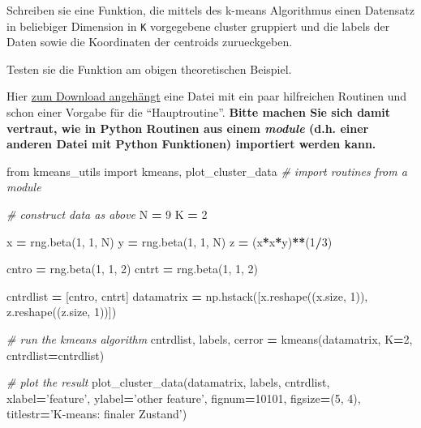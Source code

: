 \documentclass[]{book}
\newenvironment{Shaded}{\begin{snugshade}}{\end{snugshade}}
\newcommand{\CommentTok}[1]{\textcolor[rgb]{0.56,0.35,0.01}{\textit{#1}}}
\newcommand{\DecValTok}[1]{\textcolor[rgb]{0.00,0.00,0.81}{#1}}
\newcommand{\ImportTok}[1]{#1}
\newcommand{\NormalTok}[1]{#1}
\newcommand{\OperatorTok}[1]{\textcolor[rgb]{0.81,0.36,0.00}{\textbf{#1}}}
\newcommand{\StringTok}[1]{\textcolor[rgb]{0.31,0.60,0.02}{#1}}
\theoremstyle{definition}
\theoremstyle{definition}
\theoremstyle{definition}
\theoremstyle{definition}
\theoremstyle{remark}
\begin{document}
Schreiben sie eine Funktion, die mittels des k-means Algorithmus einen Datensatz in beliebiger Dimension in \texttt{K} vorgegebene cluster gruppiert und die labels der Daten sowie die Koordinaten der centroids zurueckgeben.

Testen sie die Funktion am obigen theoretischen Beispiel.

Hier \href{bilder/kmeans_utils.py}{zum Download angehängt} eine Datei mit ein paar hilfreichen Routinen und schon einer Vorgabe für die ``Hauptroutine''. \textbf{Bitte machen Sie sich damit vertraut, wie in Python Routinen aus einem \emph{module} (d.h. einer anderen Datei mit Python Funktionen) importiert werden kann.}

\begin{Shaded}
\begin{Highlighting}[]
\ImportTok{from}\NormalTok{ kmeans_utils }\ImportTok{import}\NormalTok{ kmeans, plot_cluster_data}
\CommentTok{# import routines from a module}

\CommentTok{# construct data as above}
\NormalTok{N }\OperatorTok{=} \DecValTok{9}
\NormalTok{K }\OperatorTok{=} \DecValTok{2}

\NormalTok{x }\OperatorTok{=}\NormalTok{ rng.beta(}\DecValTok{1}\NormalTok{, }\DecValTok{1}\NormalTok{, N)}
\NormalTok{y }\OperatorTok{=}\NormalTok{ rng.beta(}\DecValTok{1}\NormalTok{, }\DecValTok{1}\NormalTok{, N)}
\NormalTok{z }\OperatorTok{=}\NormalTok{ (x}\OperatorTok{*}\NormalTok{x}\OperatorTok{*}\NormalTok{y)}\OperatorTok{**}\NormalTok{(}\DecValTok{1}\OperatorTok{/}\DecValTok{3}\NormalTok{)}

\NormalTok{cntro }\OperatorTok{=}\NormalTok{ rng.beta(}\DecValTok{1}\NormalTok{, }\DecValTok{1}\NormalTok{, }\DecValTok{2}\NormalTok{)}
\NormalTok{cntrt }\OperatorTok{=}\NormalTok{ rng.beta(}\DecValTok{1}\NormalTok{, }\DecValTok{1}\NormalTok{, }\DecValTok{2}\NormalTok{)}

\NormalTok{cntrdlist }\OperatorTok{=}\NormalTok{ [cntro, cntrt]}
\NormalTok{datamatrix }\OperatorTok{=}\NormalTok{ np.hstack([x.reshape((x.size, }\DecValTok{1}\NormalTok{)), z.reshape((z.size, }\DecValTok{1}\NormalTok{))])}

\CommentTok{# run the kmeans algorithm}
\NormalTok{cntrdlist, labels, cerror }\OperatorTok{=}\NormalTok{ kmeans(datamatrix, K}\OperatorTok{=}\DecValTok{2}\NormalTok{, cntrdlist}\OperatorTok{=}\NormalTok{cntrdlist)}

\CommentTok{# plot the result}
\NormalTok{plot_cluster_data(datamatrix, labels, cntrdlist,}
\NormalTok{                  xlabel}\OperatorTok{=}\StringTok{'feature'}\NormalTok{, ylabel}\OperatorTok{=}\StringTok{'other feature'}\NormalTok{,}
\NormalTok{                  fignum}\OperatorTok{=}\DecValTok{10101}\NormalTok{, figsize}\OperatorTok{=}\NormalTok{(}\DecValTok{5}\NormalTok{, }\DecValTok{4}\NormalTok{),}
\NormalTok{                  titlestr}\OperatorTok{=}\StringTok{'K-means: finaler Zustand'}\NormalTok{)}
\end{Highlighting}
\end{Shaded}
\end{document}
